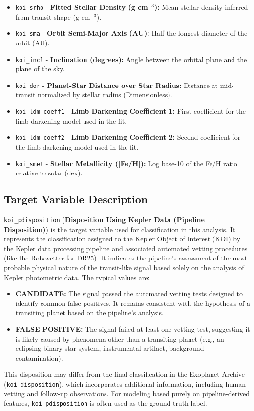 \begin{itemize}
    \item \texttt{koi\_srho} - \textbf{Fitted Stellar Density (g cm$^{-3}$):} Mean stellar density inferred from transit shape (g cm$^{-3}$).
    \item \texttt{koi\_sma} - \textbf{Orbit Semi-Major Axis (AU):} Half the longest diameter of the orbit (AU).
    \item \texttt{koi\_incl} - \textbf{Inclination (degrees):} Angle between the orbital plane and the plane of the sky.
    \item \texttt{koi\_dor} - \textbf{Planet-Star Distance over Star Radius:} Distance at mid-transit normalized by stellar radius (Dimensionless).
    \item \texttt{koi\_ldm\_coeff1} - \textbf{Limb Darkening Coefficient 1:} First coefficient for the limb darkening model used in the fit.
    \item \texttt{koi\_ldm\_coeff2} - \textbf{Limb Darkening Coefficient 2:} Second coefficient for the limb darkening model used in the fit.
    \item \texttt{koi\_smet} - \textbf{Stellar Metallicity ([Fe/H]):} Log base-10 of the Fe/H ratio relative to solar (dex).
\end{itemize}

\subsection{Target Variable Description}
\texttt{koi\_pdisposition} (\textbf{Disposition Using Kepler Data (Pipeline Disposition)}) is the target variable used for classification in this analysis. It represents the classification assigned to the Kepler Object of Interest (KOI) by the Kepler data processing pipeline and associated automated vetting procedures (like the Robovetter for DR25). It indicates the pipeline's assessment of the most probable physical nature of the transit-like signal based solely on the analysis of Kepler photometric data. The typical values are:
\begin{itemize}
    \item \textbf{CANDIDATE:} The signal passed the automated vetting tests designed to identify common false positives. It remains consistent with the hypothesis of a transiting planet based on the pipeline's analysis.
    \item \textbf{FALSE POSITIVE:} The signal failed at least one vetting test, suggesting it is likely caused by phenomena other than a transiting planet (e.g., an eclipsing binary star system, instrumental artifact, background contamination).
\end{itemize}
This disposition may differ from the final classification in the Exoplanet Archive (\texttt{koi\_disposition}), which incorporates additional information, including human vetting and follow-up observations. For modeling based purely on pipeline-derived features, \texttt{koi\_pdisposition} is often used as the ground truth label.

